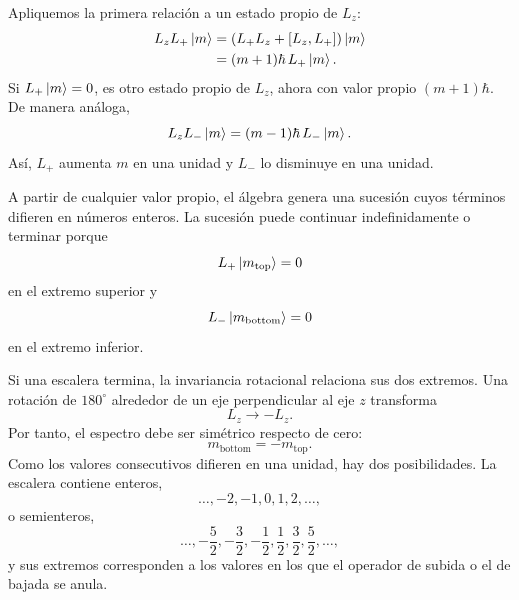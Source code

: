 Apliquemos la primera relación a un estado propio de \(L_z\):
\begin{align}
L_zL_+\left\lvert m\right\rangle
&=\left(L_+L_z+[L_z,L_+]\right)\left\lvert m\right\rangle\\
&=(m+1)\hbar\,L_+\left\lvert m\right\rangle.
\end{align}
Si \(L_+\left\lvert m\right\rangle=0\), es otro estado propio de \(L_z\), ahora con valor propio \((m+1)\hbar\). De manera análoga,
\begin{equation}
L_zL_-\left\lvert m\right\rangle
=(m-1)\hbar\,L_-\left\lvert m\right\rangle.
\end{equation}
Así, \(L_+\) aumenta \(m\) en una unidad y \(L_-\) lo disminuye en una unidad.

A partir de cualquier valor propio, el álgebra genera una sucesión cuyos términos difieren en números enteros. La sucesión puede continuar indefinidamente o terminar porque
\begin{equation}
L_+\left\lvert m_{\mathrm{top}}\right\rangle=0
\end{equation}
en el extremo superior y
\begin{equation}
L_-\left\lvert m_{\mathrm{bottom}}\right\rangle=0
\end{equation}
en el extremo inferior.

\begin{classroomqa}
\end{classroomqa}

Si una escalera termina, la invariancia rotacional relaciona sus dos extremos. Una rotación de \(180^\circ\) alrededor de un eje perpendicular al eje \(z\) transforma
\begin{equation}
L_z\longrightarrow-L_z.
\end{equation}
Por tanto, el espectro debe ser simétrico respecto de cero:
\begin{equation}
m_{\mathrm{bottom}}=-m_{\mathrm{top}}.
\end{equation}
Como los valores consecutivos difieren en una unidad, hay dos posibilidades. La escalera contiene enteros,
\begin{equation}
\ldots,-2,-1,0,1,2,\ldots,
\end{equation}
o semienteros,
\begin{equation}
\ldots,-\frac{5}{2},-\frac{3}{2},-\frac{1}{2},
\frac{1}{2},\frac{3}{2},\frac{5}{2},\ldots,
\end{equation}
y sus extremos corresponden a los valores en los que el operador de subida o el de bajada se anula.

